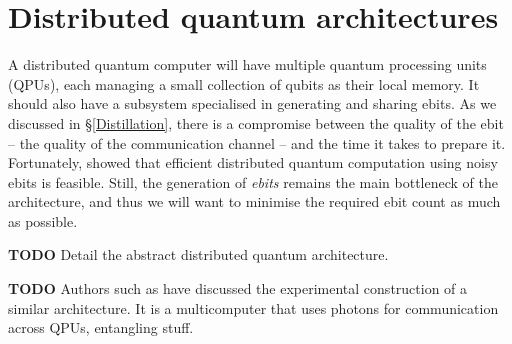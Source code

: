 \section{Distributed quantum architectures}
\label{DQC_Architecture} 

A distributed quantum computer will have multiple quantum processing units (QPUs), each managing a small collection of qubits as their local memory. It should also have a subsystem specialised in generating and sharing ebits. As we discussed in \S\ref{Distillation}, there is a compromise between the quality of the ebit -- the quality of the communication channel -- and the time it takes to prepare it. Fortunately, \citet{NoisyChannels} showed that efficient distributed quantum computation using noisy ebits is feasible. Still, the generation of \textit{ebits} remains the main bottleneck of the architecture, and thus we will want to minimise the required ebit count as much as possible. 

\textbf{TODO} Detail the abstract distributed quantum architecture.

\textbf{TODO} Authors such as \citet{DistributedQCHW} have discussed the experimental construction of a similar architecture. It is a multicomputer that uses photons for communication across QPUs, entangling stuff. 